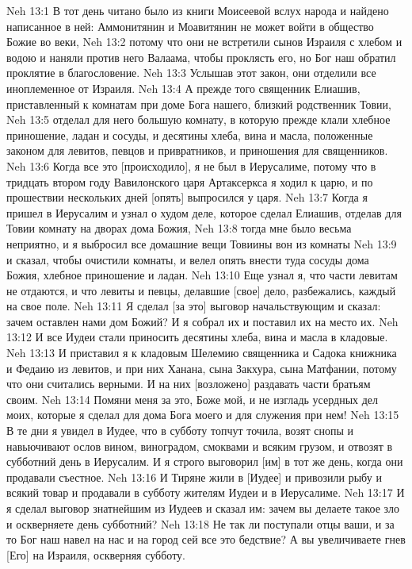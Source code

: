 Neh 13:1  В тот день читано было из книги Моисеевой вслух народа и найдено написанное в ней: Аммонитянин и Моавитянин не может войти в общество Божие во веки,
Neh 13:2  потому что они не встретили сынов Израиля с хлебом и водою и наняли против него Валаама, чтобы проклясть его, но Бог наш обратил проклятие в благословение.
Neh 13:3  Услышав этот закон, они отделили все иноплеменное от Израиля.
Neh 13:4  А прежде того священник Елиашив, приставленный к комнатам при доме Бога нашего, близкий родственник Товии,
Neh 13:5  отделал для него большую комнату, в которую прежде клали хлебное приношение, ладан и сосуды, и десятины хлеба, вина и масла, положенные законом для левитов, певцов и привратников, и приношения для священников.
Neh 13:6  Когда все это [происходило], я не был в Иерусалиме, потому что в тридцать втором году Вавилонского царя Артаксеркса я ходил к царю, и по прошествии нескольких дней [опять] выпросился у царя.
Neh 13:7  Когда я пришел в Иерусалим и узнал о худом деле, которое сделал Елиашив, отделав для Товии комнату на дворах дома Божия,
Neh 13:8  тогда мне было весьма неприятно, и я выбросил все домашние вещи Товиины вон из комнаты
Neh 13:9  и сказал, чтобы очистили комнаты, и велел опять внести туда сосуды дома Божия, хлебное приношение и ладан.
Neh 13:10  Еще узнал я, что части левитам не отдаются, и что левиты и певцы, делавшие [свое] дело, разбежались, каждый на свое поле.
Neh 13:11  Я сделал [за это] выговор начальствующим и сказал: зачем оставлен нами дом Божий? И я собрал их и поставил их на место их.
Neh 13:12  И все Иудеи стали приносить десятины хлеба, вина и масла в кладовые.
Neh 13:13  И приставил я к кладовым Шелемию священника и Садока книжника и Федаию из левитов, и при них Ханана, сына Закхура, сына Матфании, потому что они считались верными. И на них [возложено] раздавать части братьям своим.
Neh 13:14  Помяни меня за это, Боже мой, и не изгладь усердных дел моих, которые я сделал для дома Бога моего и для служения при нем!
Neh 13:15  В те дни я увидел в Иудее, что в субботу топчут точила, возят снопы и навьючивают ослов вином, виноградом, смоквами и всяким грузом, и отвозят в субботний день в Иерусалим. И я строго выговорил [им] в тот же день, когда они продавали съестное.
Neh 13:16  И Тиряне жили в [Иудее] и привозили рыбу и всякий товар и продавали в субботу жителям Иудеи и в Иерусалиме.
Neh 13:17  И я сделал выговор знатнейшим из Иудеев и сказал им: зачем вы делаете такое зло и оскверняете день субботний?
Neh 13:18  Не так ли поступали отцы ваши, и за то Бог наш навел на нас и на город сей все это бедствие? А вы увеличиваете гнев [Его] на Израиля, оскверняя субботу.
